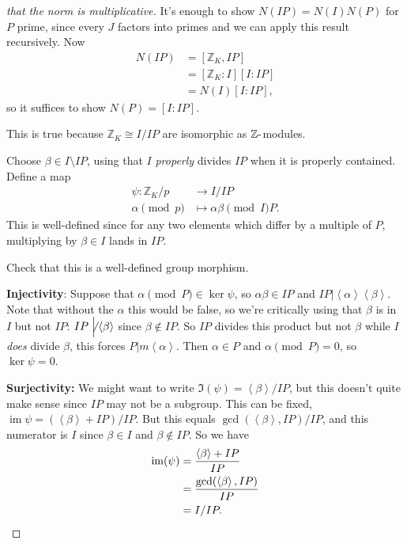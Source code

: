 \begin{proof}[that the norm is multiplicative]

It's enough to show \(N(IP) = N(I) N(P)\) for \(P\) prime, since every
\(J\) factors into primes and we can apply this result recursively. Now
\begin{align*}
N(IP) 
&= [{\mathbb{Z}}_K, IP] \\
&= [{\mathbb{Z}}_K: I] [I : IP] \\
&= N(I) [I: IP]
,\end{align*}
so it suffices to show \(N(P) = [I: IP]\).

\begin{claim}

This is true because \({\mathbb{Z}}_K \cong I/IP\) are isomorphic as
\({\mathbb{Z}}{\hbox{-}}\)modules.

\end{claim}

Choose \(\beta \in I\setminus IP\), using that \(I\) \emph{properly}
divides \(IP\) when it is properly contained. Define a map
\begin{align*}
\psi: {\mathbb{Z}}_K/p &\to I/IP \\
\alpha \pmod p  &\mapsto \alpha \beta \pmod IP
.\end{align*}
This is well-defined since for any two elements which differ by a
multiple of \(P\), multiplying by \(\beta \in I\) lands in \(IP\).

\begin{exercise}[?]

Check that this is a well-defined group morphism.

\end{exercise}

\hfill\break

\textbf{Injectivity}: Suppose that \(\alpha\pmod P \in \ker \psi\), so
\(\alpha \beta\in IP\) and
\(IP \mathrel{\Big|}\left\langle{ \alpha }\right\rangle \left\langle{ \beta }\right\rangle\).
Note that without the \(\alpha\) this would be false, so we're
critically using that \(\beta\) is in \(I\) but not \(IP\):
\(IP\not\mathrel{\Big|}\left\langle{ \beta }\right\rangle\) since
\(\beta \not\in IP\). So \(IP\) divides this product but not \(\beta\)
while \(I\) \emph{does} divide \(\beta\), this forces
\(P\mathrel{\Big|}m \left\langle{ \alpha }\right\rangle\). Then
\(\alpha\in P\) and \(\alpha\pmod P = 0\), so \(\ker \psi = 0\).

\hfill\break

\textbf{Surjectivity:} We might want to write
\(\Im(\psi) = \left\langle{ \beta }\right\rangle / IP\), but this
doesn't quite make sense since \(IP\) may not be a subgroup. This can be
fixed,
\(\operatorname{im}\psi = ( \left\langle{ \beta }\right\rangle + IP) / IP\).
But this equals \(\gcd( \left\langle{ \beta }\right\rangle, IP ) / IP\),
and this numerator is \(I\) since \(\beta\in I\) and
\(\beta\not\in IP\). So we have
\begin{align*}
\operatorname{im}(\psi) 
&= {\left\langle{ \beta }\right\rangle + IP \over  IP } \\
&= { \gcd( \left\langle{ \beta }\right\rangle, IP ) \over IP } \\
&= I/IP
.\end{align*}


\end{proof}
